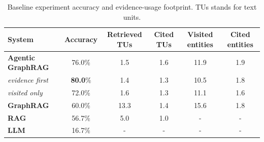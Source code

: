 \documentclass[
]{ceurart}
\begin{document}
\begin{table}[t]
\centering
\scriptsize
\setlength{\tabcolsep}{4pt}
\caption{Baseline experiment accuracy and evidence-usage footprint. TUs stands for text units.}
\label{tab:step11-baseline}
\begin{tabular}{@{}p{}ccccc@{}}
\toprule
System & Accuracy & Retrieved TUs & Cited TUs & Visited entities & Cited entities \\
\midrule
\textbf{Agentic GraphRAG} & 76.0\% & 1.5 & 1.6 & 11.9 & 1.9 \\
\hspace{1em}\textit{evidence first} & \textbf{80.0}\% & 1.4 & 1.3 & 10.5 & 1.8 \\
\hspace{1em}\textit{visited only} & 72.0\% & 1.6 & 1.3 & 11.1 & 1.6 \\
\textbf{GraphRAG} & 60.0\% & 13.3 & 1.4 & 15.6 & 1.8 \\
\textbf{RAG} & 56.7\% & 5.0 & 1.0 & - & - \\
\textbf{LLM} & 16.7\% & - & - & - & - \\

\bottomrule
\end{tabular}
\end{table}
\end{document}
